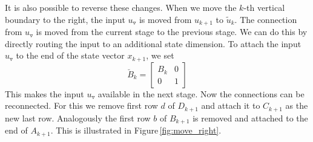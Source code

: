\documentclass[doctype=mastersthesis,BCOR=15mm,biblatex]{ldvbook}%
\newcommand{\m}{\triangledown} %
\begin{document}
It is also possible to reverse these changes.
When we move the $k$-th vertical boundary to the right, the input $u_\m$ is moved from $u_{k+1}$ to $\tilde{u}_k$.
The connection from $u_\m$ is moved from the current stage to the previous stage.
We can do this by directly routing the input to an additional state dimension.
To attach the input $u_\m$ to the end of the state vector $x_{k+1}$, we set 
\begin{equation}
	\breve{B}_k = \begin{bmatrix}
	B_k & 0\\
	0 & 1
	\end{bmatrix}
\end{equation}
This makes the input $u_\m$ available in the next stage.
Now the connections can be reconnected.
For this we remove first row $d$ of $D_{k+1}$ and attach it to $C_{k+1}$ as the new last row. 
Analogously the first row $b$ of $B_{k+1}$ is removed and attached to the end of $A_{k+1}$.
This is illustrated in Figure\,\ref{fig:move_right}.
\end{document}
